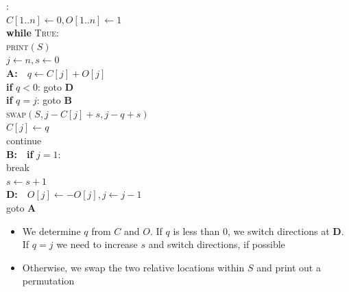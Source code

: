 \documentclass[aspectratio=169]{beamer}
\begin{document}
\begin{frame}{}
\begin{minipage}[c]{0.6\textwidth}
\begin{nalgo}
:
\\\label{}  {\color{lightgray}$C[1..n] \gets 0, O[1..n] \gets 1$}
\\\label{}  {\color{lightgray}\textbf{while} \textsc{True}:\+}
\\\label{}      {\color{lightgray}\textsc{print}$(S)$}
\\\label{}      {\color{lightgray}$j \gets n, s \gets 0$}
\\\label{}      \textbf{A:}~~$q \gets C[j] + O[j]$\+
\\\label{}          \textbf{if} $q < 0$: goto \textbf{D}
\\\label{}          \textbf{if} $q = j$: goto \textbf{B}
\\\label{}          \textsc{swap}$(S, j-C[j]+s, j-q+s)$
\\\label{}          $C[j] \gets q$
\\\label{}          continue\-
\\\label{}      {\color{lightgray}\textbf{B:}~~\textbf{if} $j=1$:\+\+}
\\\label{}              {\color{lightgray}break\-}
\\\label{}          {\color{lightgray}$s \gets s+1$\-}
\\\label{}    {\color{lightgray}\textbf{D:}~~$O[j] \gets -O[j], j \gets j-1$\+}
\\\label{}      {\color{lightgray}goto \textbf{A}}
\end{nalgo}
\end{minipage}
\begin{minipage}[c]{0.35\textwidth}
\begin{itemize}
    \item We determine $q$ from $C$ and $O$. If $q$ is less than 0, we switch directions at \textbf{D}. If $q=j$ we need to increase $s$ and switch directions, if possible \pause
    \item Otherwise, we swap the two relative locations within $S$ and print out a permutation
\end{itemize}
\end{minipage}
\end{frame}
\end{document}
